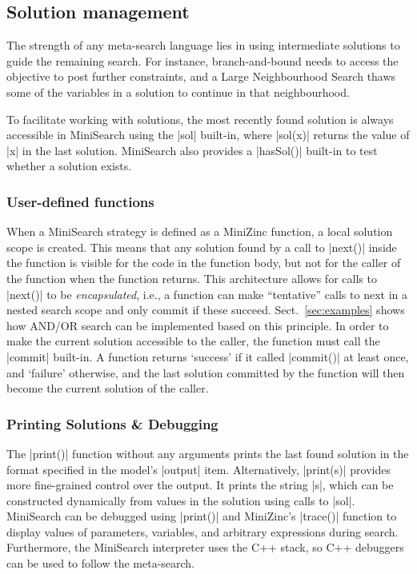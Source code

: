 \documentclass[a4paper,13pt,onecolumn]{article}%
\newcommand{\MiniZinc}{\mbox{\sc MiniZinc}\xspace}
\newcommand{\MiniSearch}{\mbox{\sc MiniSearch}\xspace}
\begin{document}
\subsection{Solution management}

The strength of any meta-search language lies in using intermediate solutions to guide the remaining search. For instance, branch-and-bound needs to access the objective to post further constraints, and a Large Neighbourhood Search thaws some of the variables in a solution to continue in that neighbourhood.

To facilitate working with solutions, the most recently found solution is always accessible in \MiniSearch using the \mzninline|sol| built-in, where \mzninline|sol(x)| returns the value of \mzninline|x| in the last solution. \MiniSearch also provides a \mzninline|hasSol()| built-in to test whether a solution exists.

\subsubsection{User-defined functions}
When a \MiniSearch strategy is defined as a \MiniZinc function, a local solution scope is created. This means that any solution found by a call to \mzninline|next()| inside the function is visible for the code in the function body, but not for the caller of the function when the function returns. 
This architecture allows for calls to \mzninline|next()| to be \emph{encapsulated}, i.e., a function can make ``tentative'' calls to next in a nested search scope and only commit if these succeed. Sect.~\ref{sec:examples} shows how AND/OR search can be implemented based on this principle.
In order to make the current solution accessible to the caller, the function must call the \mzninline|commit| built-in. A function returns `success' if it called \mzninline|commit()| at least once, and `failure' otherwise, and the last solution committed by the function will then become the current solution of the caller. 

\subsubsection{Printing Solutions \& Debugging}
The \mzninline|print()| function without any arguments prints the last found solution in the format specified in the model's \mzninline|output| item. Alternatively, \mzninline|print(s)| provides more fine-grained control over the output. It prints the string \mzninline|s|, which can be constructed dynamically from values in the solution using calls to \mzninline|sol|.
\MiniSearch can be debugged using \mzninline|print()| and \MiniZinc's \mzninline|trace()| function to display values of parameters, variables, and 
arbitrary expressions during search. Furthermore, the \MiniSearch interpreter uses the C++ stack, so C++ debuggers can be used to follow the meta-search.
\end{document}
